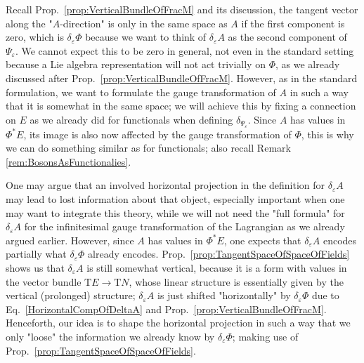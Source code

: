 Recall Prop.~\ref{prop:VerticalBundleOfFracM} and its discussion, the tangent vector along the "$A$-direction" is only in the same space as $A$ if the first component is zero, which is $\delta_\varepsilon \Phi$ because we want to think of $\delta_\varepsilon A$ as the second component of $\Psi_\varepsilon$. We cannot expect this to be zero in general, not even in the standard setting because a Lie algebra representation will not act trivially on $\Phi$, as we already discussed after Prop.~\ref{prop:VerticalBundleOfFracM}. However, as in the standard formulation, we want to formulate the gauge transformation of $A$ in such a way that it is somewhat in the same space; we will achieve this by fixing a connection on $E$ as we already did for functionals when defining $\delta_{\Psi_\varepsilon}$. Since $A$ has values in $\Phi^*E$, its image is also now affected by the gauge transformation of $\Phi$, this is why we can do something similar as for functionals; also recall Remark \ref{rem:BosonsAsFunctionalies}. 

One may argue that an involved horizontal projection in the definition for $\delta_\varepsilon A$ may lead to lost information about that object, especially important when one may want to integrate this theory, while we will not need the "full formula" for $\delta_\varepsilon A$ for the infinitesimal gauge transformation of the Lagrangian as we already argued earlier. However, since $A$ has values in $\Phi^*E$, one expects that $\delta_\varepsilon A$ encodes partially what $\delta_\varepsilon \Phi$ already encodes. Prop.~\ref{prop:TangentSpaceOfSpaceOfFields} shows us that $\delta_\varepsilon A$ is still somewhat vertical, because it is a form with values in the vector bundle $\mathrm{T}E \to \mathrm{T}N$, whose linear structure is essentially given by the vertical (prolonged) structure; $\delta_\varepsilon A$ is just shifted "horizontally" by $\delta_\varepsilon \Phi$ due to Eq.~\eqref{HorizontalCompOfDeltaA} and Prop.~\ref{prop:VerticalBundleOfFracM}. Henceforth, our idea is to shape the horizontal projection in such a way that we only "loose" the information we already know by $\delta_\varepsilon \Phi$; making use of Prop.~\ref{prop:TangentSpaceOfSpaceOfFields}.

